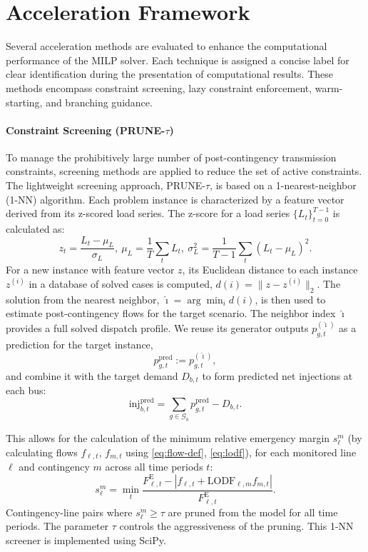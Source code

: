 \documentclass{ieeeaccess}
\begin{document}
\section{Acceleration Framework}
Several acceleration methods are evaluated to enhance the computational performance of the MILP solver. Each technique is assigned a concise label for clear identification during the presentation of computational results. These methods encompass constraint screening, lazy constraint enforcement, warm-starting, and branching guidance.\

\paragraph{Constraint Screening (PRUNE-$\tau$)}
To manage the prohibitively large number of post-contingency transmission constraints, screening methods are applied to reduce the set of active constraints. The lightweight screening approach, PRUNE-$\tau$, is based on a 1-nearest-neighbor (1-NN) algorithm. Each problem instance is characterized by a feature vector derived from its z-scored load series. The z-score for a load series $\{L_t\}_{t=0}^{T-1}$ is calculated as:
\begin{equation}
z_t=\frac{L_t-\mu_L}{\sigma_L}, \ \mu_L=\frac{1}{T}\sum_t L_t, \ \sigma_L^2=\frac{1}{T-1}\sum_t(L_t-\mu_L)^2.
\end{equation}
For a new instance with feature vector $z$, its Euclidean distance to each instance $z^{(i)}$ in a database of solved cases is computed, $d(i)=\big\|z-z^{(i)}\big\|_2$. The solution from the nearest neighbor, $\hat{\imath}=\arg\min_i d(i)$, is then used to estimate post-contingency flows for the target scenario. The neighbor index $\hat{\imath}$ provides a full solved dispatch profile. We reuse its generator outputs
$p^{(\hat{\imath})}_{g,t}$ as a prediction for the target instance,
\begin{equation}
p^{\mathrm{pred}}_{g,t} := p^{(\hat{\imath})}_{g,t},
\end{equation}
and combine it with the target demand $D_{b,t}$ to form predicted net injections at each bus:
\begin{equation}
\mathrm{inj}^{\mathrm{pred}}_{b,t}=\sum_{g\in\mathcal{G}_b} p^{\mathrm{pred}}_{g,t} - D_{b,t}.
\end{equation}

This allows for the calculation of the minimum relative emergency margin $s^{m}_{\ell}$ (by calculating flows $f_{\ell,t}$, $f_{m,t}$ using \eqref{eq:flow-def}, \eqref{eq:lodf}), for each monitored line $\ell$ and contingency $m$ across all time periods $t$:
\begin{equation}
s^{m}_{\ell}=\min_t \frac{F^{\mathrm{E}}_{\ell,t}-|f_{\ell,t}+\mathrm{LODF}_{\ell,m}f_{m,t}|}{F^{\mathrm{E}}_{\ell,t}}.
\end{equation}
Contingency-line pairs where $s_{\ell}^m \ge \tau$ are pruned from the model for all time periods. The parameter $\tau$ controls the aggressiveness of the pruning. This 1-NN screener is implemented using SciPy.
\end{document}
